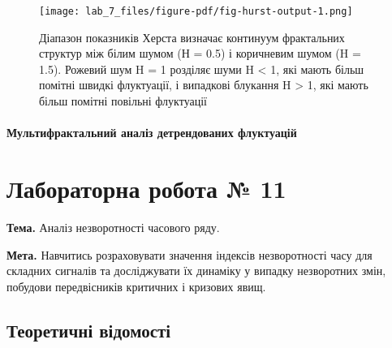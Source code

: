 \documentclass[
  letterpaper,
]{report}
\begin{document}
\begin{figure}[H]

{\centering \texttt{[image: lab\_7\_files/figure-pdf/fig-hurst-output-1.png]}

}

\caption{\label{fig-hurst}Діапазон показників Херста визначає континуум
фрактальних структур між білим шумом (Н = 0.5) і коричневим шумом (H =
1.5). Рожевий шум H = 1 розділяє шуми H \textless{} 1, які мають більш
помітні швидкі флуктуації, і випадкові блукання H \textgreater{} 1, які
мають більш помітні повільні флуктуації}

\end{figure}

\hypertarget{ux43cux443ux43bux44cux442ux438ux444ux440ux430ux43aux442ux430ux43bux44cux43dux438ux439-ux430ux43dux430ux43bux456ux437-ux434ux435ux442ux440ux435ux43dux434ux43eux432ux430ux43dux438ux445-ux444ux43bux443ux43aux442ux443ux430ux446ux456ux439-1}{%
\subsubsection{Мультифрактальний аналіз детрендованих
флуктуацій}\label{ux43cux443ux43bux44cux442ux438ux444ux440ux430ux43aux442ux430ux43bux44cux43dux438ux439-ux430ux43dux430ux43bux456ux437-ux434ux435ux442ux440ux435ux43dux434ux43eux432ux430ux43dux438ux445-ux444ux43bux443ux43aux442ux443ux430ux446ux456ux439-1}}


\hypertarget{ux43bux430ux431ux43eux440ux430ux442ux43eux440ux43dux430-ux440ux43eux431ux43eux442ux430-11}{%
\chapter{Лабораторна робота №
11}\label{ux43bux430ux431ux43eux440ux430ux442ux43eux440ux43dux430-ux440ux43eux431ux43eux442ux430-11}}

\textbf{Тема.} Аналіз незворотності часового ряду.

\textbf{Мета.} Навчитись розраховувати значення індексів незворотності
часу для складних сигналів та досліджувати їх динаміку у випадку
незворотних змін, побудови передвісників критичних і кризових явищ.

\hypertarget{ux442ux435ux43eux440ux435ux442ux438ux447ux43dux456-ux432ux456ux434ux43eux43cux43eux441ux442ux456-7}{%
\section{Теоретичні
відомості}\label{ux442ux435ux43eux440ux435ux442ux438ux447ux43dux456-ux432ux456ux434ux43eux43cux43eux441ux442ux456-7}}
\end{document}
